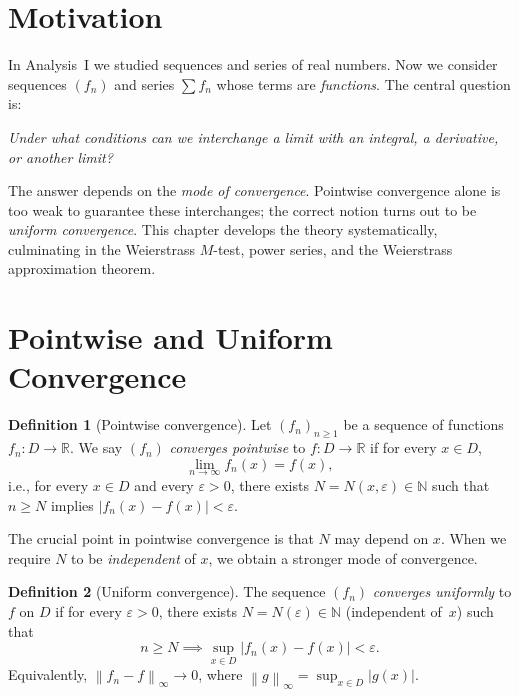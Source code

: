 \documentclass[12pt,a4paper]{book}
\theoremstyle{definition}
\newtheorem{definition}{Definition}[chapter]
\newcommand{\N}{\mathbb{N}}
\newcommand{\R}{\mathbb{R}}
\newcommand{\eps}{\varepsilon}
\newcommand{\abs}[1]{\left\lvert #1 \right\rvert}
\newcommand{\norm}[1]{\left\lVert #1 \right\rVert}
\begin{document}
\section*{Motivation}

In Analysis~I we studied sequences and series of real numbers.  Now we
consider sequences $(f_n)$ and series $\sum f_n$ whose terms are
\emph{functions}.  The central question is:

\begin{center}
\itshape
Under what conditions can we interchange a limit with an integral,
a derivative, or another limit?
\end{center}

The answer depends on the \emph{mode of convergence}.  Pointwise
convergence alone is too weak to guarantee these interchanges; the
correct notion turns out to be \emph{uniform convergence}.  This chapter
develops the theory systematically, culminating in the Weierstrass
$M$-test, power series, and the Weierstrass approximation theorem.


\section{Pointwise and Uniform Convergence}\label{sec:pointwise-uniform}

\begin{definition}[Pointwise convergence]\label{def:pointwise-conv}
  Let $(f_n)_{n\ge1}$ be a sequence of functions $f_n\colon D\to\R$.
  We say $(f_n)$ \emph{converges pointwise} to $f\colon D\to\R$ if for
  every $x\in D$,
  \[
    \lim_{n\to\infty}f_n(x) = f(x),
  \]
  i.e., for every $x\in D$ and every $\eps>0$, there exists
  $N=N(x,\eps)\in\N$ such that $n\ge N$ implies $\abs{f_n(x)-f(x)}<\eps$.
\end{definition}

The crucial point in pointwise convergence is that $N$ may depend on $x$.
When we require $N$ to be \emph{independent} of $x$, we obtain a
stronger mode of convergence.

\begin{definition}[Uniform convergence]\label{def:uniform-conv}
  The sequence $(f_n)$ \emph{converges uniformly} to $f$ on $D$ if for
  every $\eps>0$, there exists $N=N(\eps)\in\N$ (independent of~$x$)
  such that
  \[
    n\ge N \implies \sup_{x\in D}\abs{f_n(x)-f(x)} < \eps.
  \]
  Equivalently, $\norm{f_n-f}_\infty\to0$, where
  $\norm{g}_\infty=\sup_{x\in D}\abs{g(x)}$.
\end{definition}
\end{document}
